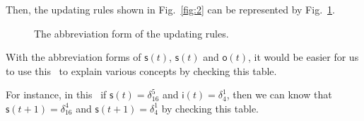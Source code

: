 Then, the updating rules shown in Fig.~\ref{fig:2} can be represented by Fig.~\ref{fig:6}.
 \begin{figure}[thpb]
      \centering
      
      \caption{The abbreviation form of the updating rules.}
      \label{fig:6}
   \end{figure}
   With the abbreviation forms of $\mathsf{s}(t)$, $\mathsf{s}(t)$ and $\mathsf{o}(t)$, it would be easier for us to use this \BCN\ to explain various concepts by checking this table.
   
   For instance, in this \BCN\ if $\mathsf{s}(t)=\delta^5_{16}$ and $\mathsf{i}(t)=\delta^1_{4}$, then we can know that $\mathsf{s}(t+1)=\delta^4_{16}$  and $\mathsf{s}(t+1)=\delta^1_{4}$ by checking this table. 
   
